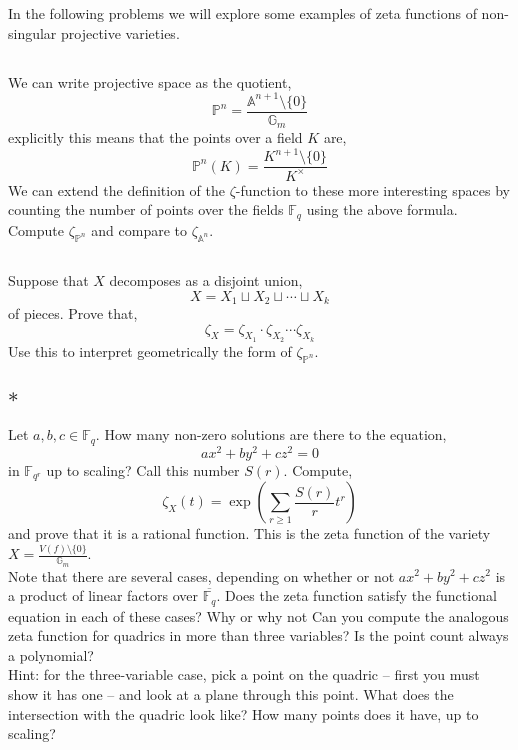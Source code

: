 \documentclass[12pt]{article}
\newcommand{\sm}{\! \setminus \!}
\newcommand{\FF}{\mathbb{F}}
\theoremstyle{remark}
\theoremstyle{definition}
\newcommand{\A}{\mathbb{A}}
\renewcommand{\P}{\mathbb{P}}
\newcommand{\Gm}{\mathbb{G}_m}
\begin{document}
In the following problems we will explore some examples of zeta functions of non-singular projective varieties. 

\subsection{}

We can write projective space as the quotient,
\[ \P^n = \frac{\A^{n+1} \sm \{ 0 \}}{\Gm} \]
explicitly this means that the points over a field $K$ are,
\[ \P^n(K) = \frac{K^{n+1} \sm \{ 0 \}}{K^\times } \]
We can extend the definition of the $\zeta$-function to these more interesting spaces by counting the number of points over the fields $\FF_q$ using the above formula. Compute $\zeta_{\P^n}$ and compare to $\zeta_{\A^n}$.

\subsection{}

Suppose that $X$ decomposes as a disjoint union,
\[ X = X_1 \sqcup X_2 \sqcup \cdots \sqcup X_k \]
of pieces. Prove that,
\[ \zeta_X = \zeta_{X_1} \cdot \zeta_{X_2} \cdots \zeta_{X_k} \]
Use this to interpret geometrically the form of $\zeta_{\P^n}$.

\subsection{$\ast$}

Let $a,b,c \in \FF_q$. How many non-zero solutions are there to the equation,
\[ a x^2 + b y^2 + c z^2 = 0 \]
in $\FF_{q^r}$ up to scaling? Call this number $S(r)$. Compute,
\[ \zeta_X(t) = \exp{ \left( \sum_{r \ge 1} \frac{S(r)}{r} t^r \right) } \] 
and prove that it is a rational function. This is the zeta function of the variety $X = \frac{V(f) \sm \{ 0 \}}{\Gm}$.
\\
Note that there are several cases, depending on whether or not $a x^2 + b y^2 + c z^2$ is a product of linear factors over $\overline{\FF_q}$. Does the zeta function satisfy the functional equation in each of these cases? Why or why not Can you compute the analogous zeta function for quadrics in more than three variables? Is the point count always a polynomial?
\\
Hint: for the three-variable case, pick a point on the quadric -- first you must show it has one -- and look at a plane through this point. What does the intersection with the quadric look like? How many points does it have, up to scaling?
\end{document}
